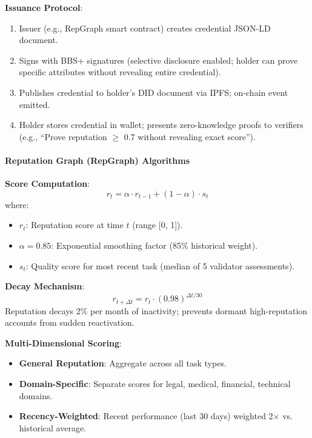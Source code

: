 \documentclass[11pt]{article}
\begin{document}
\textbf{Issuance Protocol}:
\begin{enumerate}[noitemsep]
  \item Issuer (e.g., RepGraph smart contract) creates credential JSON-LD document.
  \item Signs with BBS+ signatures (selective disclosure enabled; holder can prove specific attributes without revealing entire credential).
  \item Publishes credential to holder's DID document via IPFS; on-chain event emitted.
  \item Holder stores credential in wallet; presents zero-knowledge proofs to verifiers (e.g., ``Prove reputation $\geq$ 0.7 without revealing exact score'').
\end{enumerate}

\paragraph{Reputation Graph (RepGraph) Algorithms}

\textbf{Score Computation}:
\begin{equation}
r_t = \alpha \cdot r_{t-1} + (1 - \alpha) \cdot s_t
\end{equation}
where:
\begin{itemize}[noitemsep]
  \item $r_t$: Reputation score at time $t$ (range [0, 1]).
  \item $\alpha = 0.85$: Exponential smoothing factor (85\% historical weight).
  \item $s_t$: Quality score for most recent task (median of 5 validator assessments).
\end{itemize}

\textbf{Decay Mechanism}:
\begin{equation}
r_{t+\Delta t} = r_t \cdot (0.98)^{\Delta t / 30}
\end{equation}
Reputation decays 2\% per month of inactivity; prevents dormant high-reputation accounts from sudden reactivation.

\textbf{Multi-Dimensional Scoring}:
\begin{itemize}[noitemsep]
  \item \textbf{General Reputation}: Aggregate across all task types.
  \item \textbf{Domain-Specific}: Separate scores for legal, medical, financial, technical domains.
  \item \textbf{Recency-Weighted}: Recent performance (last 30 days) weighted 2$\times$ vs. historical average.
\end{itemize}
\end{document}
